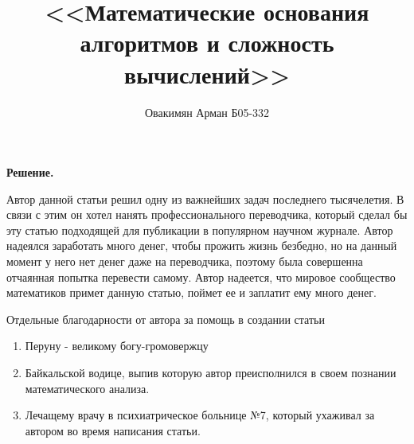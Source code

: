 \documentclass[12pt,a4paper]{extreport}
\title{<<Математические основания алгоритмов и сложность вычислений>>}
\author{Овакимян Арман Б05-332}
\theoremstyle{plain}
\theoremstyle{definition}
\newenvironment{solution}%
{\par\noindent\textbf{Решение. }}%
{\bigskip}
\begin{document}
\maketitle
\tableofcontents

\begin{solution}

Автор данной статьи решил одну из важнейших задач последнего тысячелетия. В связи с этим он хотел нанять профессионального переводчика, который сделал бы эту статью подходящей для публикации в популярном научном журнале. Автор надеялся заработать много денег, чтобы прожить жизнь безбедно, но на данный момент у него нет денег даже на переводчика, поэтому была совершенна отчаянная попытка перевести самому. Автор надеется, что мировое сообщество математиков примет данную статью, поймет ее и заплатит ему много денег.

Отдельные благодарности от автора за помощь в создании статьи 
\begin{enumerate}
    \item Перуну - великому богу-громовержцу                                                                   \
    \item Байкальской водице, выпив которую автор преисполнился в своем познании математического анализа.      \
    \item Лечащему врачу в психиатрическое больнице №7, который ухаживал за автором во время написания статьи. \
\end{enumerate}


\end{solution}
\end{document}
